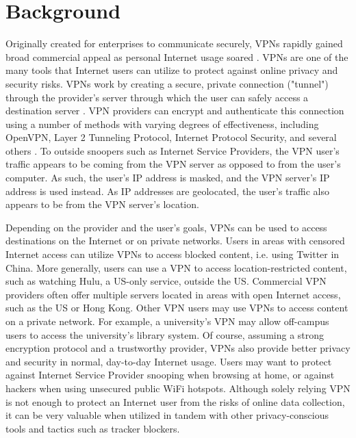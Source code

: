 \section{Background}\label{sec:background}

Originally created for enterprises to
communicate securely, VPNs rapidly gained broad commercial appeal as personal
Internet usage soared \cite{hirst_26}. VPNs are one of the many tools that Internet
users can utilize to protect against online privacy and security risks. VPNs
work by creating a secure, private connection ("tunnel") through the
provider's server through which the user can safely access a destination
server \cite{vaughan-nichols_25}. VPN providers can encrypt and authenticate this connection using
a number of methods with varying degrees of effectiveness, including OpenVPN,
Layer 2 Tunneling Protocol, Internet Protocol Security, and several others
\cite{vaughan-nichols_25}. To outside snoopers such as Internet Service Providers, the VPN user's
traffic appears to be coming from the VPN server as opposed to from the user's
computer. As such, the user's IP address is masked, and the VPN server's IP
address is used instead. As IP addresses are geolocated, the user's traffic
also appears to be from the VPN server's location.

Depending on the provider and the user's goals, VPNs can be used to access
destinations on the Internet or on private networks. Users in areas with
censored Internet access can utilize VPNs to access blocked content, i.e.
using Twitter in China. More generally, users can use a VPN to access
location-restricted content, such as watching Hulu, a US-only service, outside
the US. Commercial VPN providers often offer multiple servers located in areas
with open Internet access, such as the US or Hong Kong. Other VPN users may
use VPNs to access content on a private network. For example, a
university's VPN may allow off-campus users to access the university's library
system. Of course, assuming a strong encryption protocol and a trustworthy
provider, VPNs also provide better privacy and security in normal, day-to-day
Internet usage. Users may want to protect against Internet Service Provider
snooping when browsing at home, or against hackers when using unsecured public
WiFi hotspots. Although solely relying VPN is not enough to protect an
Internet user from the risks of online data collection, it can be very
valuable when utilized in tandem with other privacy-conscious tools and
tactics such as tracker blockers.


